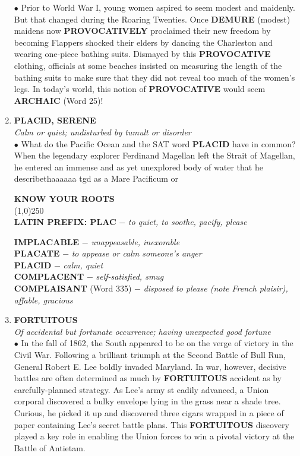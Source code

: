 \documentclass{book}
\begin{document}
\begin{enumerate}
$\bullet$ Prior to World War I, young women aspired to seem modest and maidenly. But that changed during the Roaring Twenties. Once \textbf{DEMURE} (modest) maidens now \textbf{PROVOCATIVELY} proclaimed their new freedom by becoming  Flappers shocked their elders by dancing the Charleston and wearing one-piece bathing suits. Dismayed by this \textbf{PROVOCATIVE} clothing, officials at some beaches insisted on measuring the length of the bathing suits to make sure that they did not reveal too much of the women's legs. In today's world, this notion of \textbf{PROVOCATIVE} would seem \textbf{ARCHAIC} (Word 25)! 

\item \textbf{PLACID, SERENE}\\
\textit{ Calm or quiet; undisturbed by tumult or disorder}\\

$\bullet$ What do the Pacific Ocean and the SAT word \textbf{PLACID} have in common? When the legendary explorer Ferdinand Magellan left the Strait of Magellan, he entered an immense and as yet unexplored body of water that he describethaaaaaa tgd as a Mare Pacificum or  
\begin{tcolorbox}
\begin{center}
 \textbf{KNOW YOUR ROOTS}\\
 \line(1,0){250}\\
  \textbf{ LATIN PREFIX: PLAC} $ - $ \textit{ to quiet, to soothe, pacify, please } 
\end{center}
 \textbf{IMPLACABLE} $ - $ \textit{ unappeasable, inexorable}\\
 \textbf{ PLACATE} $ - $ \textit{ to appease or calm someone's anger}\\     \textbf{PLACID} $ - $ \textit{ calm, quiet}\\
 \textbf{ COMPLACENT} $ - $ \textit{ self-satisfied, smug}\\
 \textbf{ COMPLAISANT} (Word 335) $ - $ \textit{ disposed to please (note French plaisir), affable, gracious}
\end{tcolorbox} 

 \item \textbf{FORTUITOUS}\\
 \textit{ Of accidental but fortunate occurrence; having unexpected good fortune}\\
 
$\bullet$ In the fall of 1862, the South appeared to be on the verge of victory in the Civil War. Following a brilliant triumph at the Second Battle of Bull Run, General Robert E. Lee boldly invaded Maryland. In war, however, decisive battles are often determined as much by \textbf{FORTUITOUS} accident as by carefully-planned strategy. As Lee's army st eadily advanced, a Union corporal discovered a bulky envelope lying in the grass near a shade tree. Curious, he picked it up and discovered three cigars wrapped in a piece of paper containing Lee's secret battle plans. This \textbf{FORTUITOUS} discovery played a key role in enabling the Union forces to win a pivotal victory at the Battle of Antietam. 


\end{enumerate}
\end{document}
